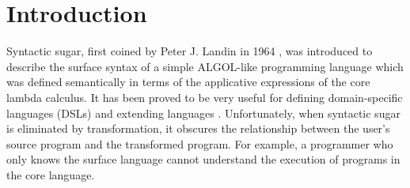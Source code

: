 \section{Introduction}









Syntactic sugar, first coined by Peter J. Landin in 1964 \cite{syntacticsugar}, was introduced to describe the surface syntax of a simple ALGOL-like programming language which was defined semantically in terms of the applicative expressions of the core lambda calculus. It has been proved to be very useful for defining domain-specific languages (DSLs) and extending languages \cite{FellFFKBMT18,CulpFFK19}.
Unfortunately, when syntactic sugar is eliminated by transformation, it obscures the relationship between the user’s source program and the transformed program. For example, a programmer who only knows the surface language cannot understand the execution of programs in the core language.

